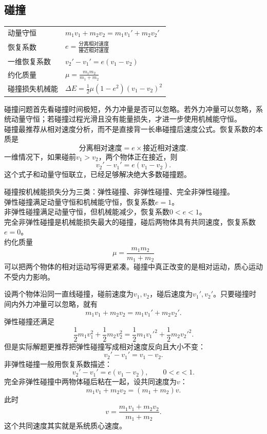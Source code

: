 \subsection{碰撞}
\begin{tabularx}{\columnwidth}{XX}
  动量守恒                 & $m_1v_1+m_2v_2=m_1v_1'+m_2v_2'$                              \\
  恢复系数                 & $e=\frac{\text{分离相对速度}}{\text{接近相对速度}}$             \\
  一维恢复系数              & $v_2'-v_1'=e(v_1-v_2)$                                        \\
  约化质量                 & $\mu=\frac{m_1m_2}{m_1+m_2}$                                  \\
  碰撞损失机械能             & $\Delta E=\frac12\mu(1-e^2)(v_1-v_2)^2$                       \\
\end{tabularx}

\begin{formulanotebox}
碰撞问题首先看碰撞时间极短，外力冲量是否可以忽略。若外力冲量可以忽略，系统动量守恒；若碰撞过程光滑且没有能量损失，才进一步使用机械能守恒。\\
碰撞最推荐从相对速度分析，而不是直接背一长串碰撞后速度公式。恢复系数的本质是
\[
  \text{分离相对速度}=e\times\text{接近相对速度}.
\]
一维情况下，如果碰前$v_1>v_2$，两个物体正在接近，则
\[
  v_2'-v_1'=e(v_1-v_2).
\]
这个式子和动量守恒联立，已经足够解决绝大多数碰撞题。
\end{formulanotebox}

\begin{keypointbox}
碰撞按机械能损失分为三类：弹性碰撞、非弹性碰撞、完全非弹性碰撞。\\
弹性碰撞满足动量守恒和机械能守恒，恢复系数$e=1$。\\
非弹性碰撞满足动量守恒，但机械能减少，恢复系数$0<e<1$。\\
完全非弹性碰撞是机械能损失最大的碰撞，碰后两物体具有共同速度，恢复系数$e=0$。\\
约化质量
\[
  \mu=\frac{m_1m_2}{m_1+m_2}
\]
可以把两个物体的相对运动写得更紧凑。碰撞中真正改变的是相对运动，质心运动不受内力影响。
\end{keypointbox}

\begin{casetypebox}[title={\strut\textcolor{white}{\bfseries 常见题型：碰撞分类}}]
设两个物体沿同一直线碰撞，碰前速度为$v_1,v_2$，碰后速度为$v_1',v_2'$。只要碰撞时间内外力冲量可以忽略，就有
\[
  m_1v_1+m_2v_2=m_1v_1'+m_2v_2'.
\]
弹性碰撞还满足
\[
  \frac12m_1v_1^2+\frac12m_2v_2^2
  =\frac12m_1{v_1'}^2+\frac12m_2{v_2'}^2.
\]
但是实际解题更推荐把弹性碰撞写成相对速度反向且大小不变：
\[
  v_2'-v_1'=v_1-v_2.
\]
非弹性碰撞一般用恢复系数描述：
\[
  v_2'-v_1'=e(v_1-v_2),\qquad 0<e<1.
\]
完全非弹性碰撞中两物体碰后粘在一起，设共同速度为$v$：
\[
  m_1v_1+m_2v_2=(m_1+m_2)v.
\]
此时
\[
  v=\frac{m_1v_1+m_2v_2}{m_1+m_2}.
\]
这个共同速度其实就是系统质心速度。
\end{casetypebox}

